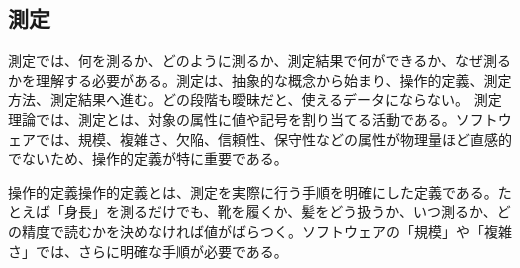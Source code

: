 \subsection{測定}
測定では、何を測るか、どのように測るか、測定結果で何ができるか、なぜ測るかを理解する必要がある。測定は、抽象的な概念から始まり、操作的定義、測定方法、測定結果へ進む。どの段階も曖昧だと、使えるデータにならない。
測定理論では、測定とは、対象の属性に値や記号を割り当てる活動である。ソフトウェアでは、規模、複雑さ、欠陥、信頼性、保守性などの属性が物理量ほど直感的でないため、操作的定義が特に重要である。
\begin{notebox}{操作的定義}操作的定義とは、測定を実際に行う手順を明確にした定義である。たとえば「身長」を測るだけでも、靴を履くか、髪をどう扱うか、いつ測るか、どの精度で読むかを決めなければ値がばらつく。ソフトウェアの「規模」や「複雑さ」では、さらに明確な手順が必要である。\end{notebox}
